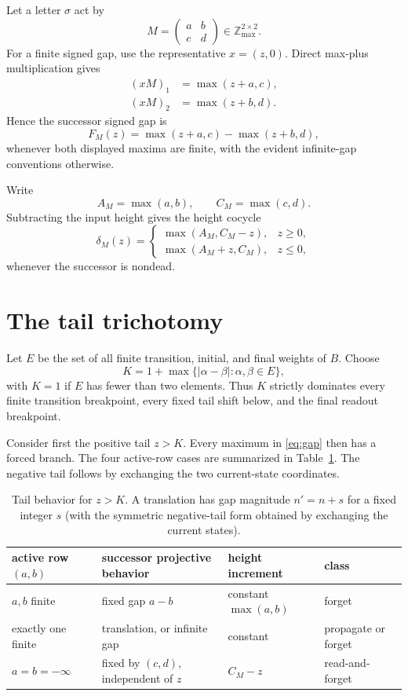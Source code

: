 \documentclass[11pt]{article}
\newcommand{\Zmax}{\mathbb{Z}_{\max}}
\newcommand{\minf}{-\infty}
\begin{document}
Let a letter $\sigma$ act by
\[
M=\begin{pmatrix}a&b\\c&d\end{pmatrix}\in\Zmax^{2\times2}.
\]
For a finite signed gap, use the representative $x=(z,0)$. Direct max-plus multiplication gives
\begin{align}
(xM)_1&=\max(z+a,c),\\
(xM)_2&=\max(z+b,d).
\end{align}
Hence the successor signed gap is
\begin{equation}\label{eq:gap}
F_M(z)=\max(z+a,c)-\max(z+b,d),
\end{equation}
whenever both displayed maxima are finite, with the evident infinite-gap conventions otherwise.

Write
\[
A_M=\max(a,b),\qquad C_M=\max(c,d).
\]
Subtracting the input height gives the height cocycle
\begin{equation}\label{eq:cocycle}
\delta_M(z)=
\begin{cases}
\max(A_M,C_M-z), & z\geq0,\\
\max(A_M+z,C_M), & z\leq0,
\end{cases}
\end{equation}
whenever the successor is nondead.

\section{The tail trichotomy}

Let $E$ be the set of all finite transition, initial, and final weights of $B$. Choose
\begin{equation}\label{eq:K}
K=1+\max\{|\alpha-\beta|:\alpha,\beta\in E\},
\end{equation}
with $K=1$ if $E$ has fewer than two elements. Thus $K$ strictly dominates every finite transition breakpoint, every fixed tail shift below, and the final readout breakpoint.

Consider first the positive tail $z>K$. Every maximum in \eqref{eq:gap} then has a forced branch. The four active-row cases are summarized in Table~\ref{tab:tail}. The negative tail follows by exchanging the two current-state coordinates.

\begin{table}[ht]
\centering
\small
\begin{tabular}{@{}llll@{}}
\toprule
active row $(a,b)$ & successor projective behavior & height increment & class \\
\midrule
$a,b$ finite & fixed gap $a-b$ & constant $\max(a,b)$ & forget \\
exactly one finite & translation, or infinite gap & constant & propagate or forget \\
$a=b=\minf$ & fixed by $(c,d)$, independent of $z$ & $C_M-z$ & read-and-forget \\
\bottomrule
\end{tabular}
\caption{Tail behavior for $z>K$. A translation has gap magnitude $n'=n+s$ for a fixed integer $s$ (with the symmetric negative-tail form obtained by exchanging the current states).}
\label{tab:tail}
\end{table}
\end{document}
